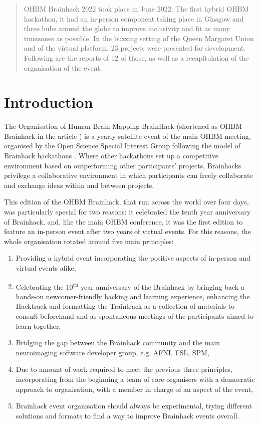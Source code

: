 \documentclass[10pt,a4paper,twocolumns]{proc}
\begin{document}
\begin{abstract}
OHBM Brainhack 2022 took place in June 2022. The first hybrid OHBM hackathon, it had an in-person component taking place in Glasgow and three hubs around the globe to improve inclusivity and fit as many timezones as possible.
In the buzzing setting of the Queen Margaret Union and of the virtual platform, 23 projects were presented for development.
Following are the reports of 12 of those, as well as a recapitulation of the organisation of the event. 
\end{abstract}

\section*{Introduction}

The Organisation of Human Brain Mapping BrainHack (shortened as OHBM
Brainhack in the article ) is a yearly satellite event of the main OHBM
meeting, organised by the Open Science Special Interest Group following
the model of Brainhack hackathons \parencite{Gau2021}.
Where other hackathons set up a competitive environment based on
outperforming other participants' projects, Brainhacks privilege a
collaborative environment in which participants can freely collaborate
and exchange ideas within and between projects.

This edition of the OHBM Brainhack, that run across the world over four
days, was particularly special for two reasons: it celebrated the tenth
year anniversary of Brainhack, and, like the main OHBM conference, it
was the first edition to feature an in-person event after two years of
virtual events. For this reasons, the whole organisation rotated around
five main principles:

\begin{enumerate}
\tightlist
\item
  Providing a hybrid event incorporating the positive aspects of
  in-person and virtual events alike,
\item
  Celebrating the 10\textsuperscript{th} year anniversary of the
  Brainhack by bringing back a hands-on newcomer-friendly hacking and
  learning experience, enhancing the Hacktrack and formatting the
  Traintrack as a collection of materials to consult beforehand and as
  spontaneous meetings of the participants aimed to learn together,
\item
  Bridging the gap between the Brainhack community and the main
  neuroimaging software developer group, e.g. AFNI, FSL, SPM,
\item
  Due to amount of work required to meet the previous three principles,
  incorporating from the beginning a team of core organisers with a
  democratic approach to organisation, with a member in charge of an
  aspect of the event,
\item
  Brainhack event organisation should always be experimental, trying
  different solutions and formats to find a way to improve Brainhack
  events overall. 
\end{enumerate}
\end{document}
